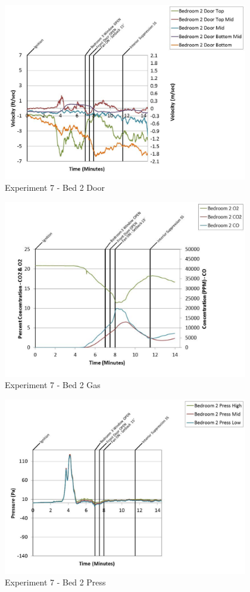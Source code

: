 \documentclass{article}
\begin{document}
\begin{appendices}
	\begin{figure}[h!]
		\centering
		\includegraphics[height=3.05in]{0_Images/Results_Charts/Exp_7_Charts/Bed2Door.pdf}
		\caption{Experiment 7 - Bed 2 Door}
	\end{figure}
 
	\clearpage

	\begin{figure}[h!]
		\centering
		\includegraphics[height=3.05in]{0_Images/Results_Charts/Exp_7_Charts/Bed2Gas.pdf}
		\caption{Experiment 7 - Bed 2 Gas}
	\end{figure}
 

	\begin{figure}[h!]
		\centering
		\includegraphics[height=3.05in]{0_Images/Results_Charts/Exp_7_Charts/Bed2Press.pdf}
		\caption{Experiment 7 - Bed 2 Press}
	\end{figure}
 

\end{appendices}
\end{document}

